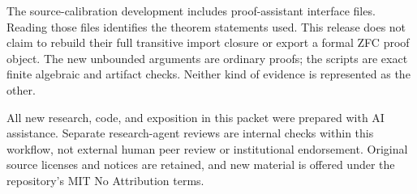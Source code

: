 The source-calibration development includes proof-assistant interface files.
Reading those files identifies the theorem statements used. This release does
not claim to rebuild their full transitive import closure or export a formal
ZFC proof object. The new unbounded arguments are ordinary proofs; the scripts
are exact finite algebraic and artifact checks. Neither kind of evidence is
represented as the other.

All new research, code, and exposition in this packet were prepared with AI
assistance. Separate research-agent reviews are internal checks within this
workflow, not external human peer review or institutional endorsement.
Original source licenses and notices are retained, and new material is offered
under the repository's MIT No Attribution terms.
